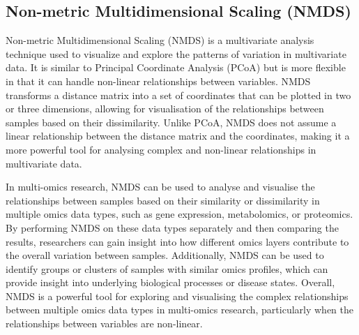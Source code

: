 \documentclass[
]{book}
\newenvironment{Shaded}{\begin{snugshade}}{\end{snugshade}}
\newcommand{\AttributeTok}[1]{\textcolor[rgb]{0.77,0.63,0.00}{#1}}
\newcommand{\CommentTok}[1]{\textcolor[rgb]{0.56,0.35,0.01}{\textit{#1}}}
\newcommand{\DecValTok}[1]{\textcolor[rgb]{0.00,0.00,0.81}{#1}}
\newcommand{\FunctionTok}[1]{\textcolor[rgb]{0.00,0.00,0.00}{#1}}
\newcommand{\NormalTok}[1]{#1}
\newcommand{\OtherTok}[1]{\textcolor[rgb]{0.56,0.35,0.01}{#1}}
\newcommand{\SpecialCharTok}[1]{\textcolor[rgb]{0.00,0.00,0.00}{#1}}
\newcommand{\StringTok}[1]{\textcolor[rgb]{0.31,0.60,0.02}{#1}}
\begin{document}
\hypertarget{nmds}{%
\subsection{Non-metric Multidimensional Scaling (NMDS)}\label{nmds}}

Non-metric Multidimensional Scaling (NMDS) is a multivariate analysis technique used to visualize and explore the patterns of variation in multivariate data. It is similar to Principal Coordinate Analysis (PCoA) but is more flexible in that it can handle non-linear relationships between variables. NMDS transforms a distance matrix into a set of coordinates that can be plotted in two or three dimensions, allowing for visualisation of the relationships between samples based on their dissimilarity. Unlike PCoA, NMDS does not assume a linear relationship between the distance matrix and the coordinates, making it a more powerful tool for analysing complex and non-linear relationships in multivariate data.

In multi-omics research, NMDS can be used to analyse and visualise the relationships between samples based on their similarity or dissimilarity in multiple omics data types, such as gene expression, metabolomics, or proteomics. By performing NMDS on these data types separately and then comparing the results, researchers can gain insight into how different omics layers contribute to the overall variation between samples. Additionally, NMDS can be used to identify groups or clusters of samples with similar omics profiles, which can provide insight into underlying biological processes or disease states. Overall, NMDS is a powerful tool for exploring and visualising the complex relationships between multiple omics data types in multi-omics research, particularly when the relationships between variables are non-linear.

\begin{Shaded}
\end{Shaded}
\end{document}
